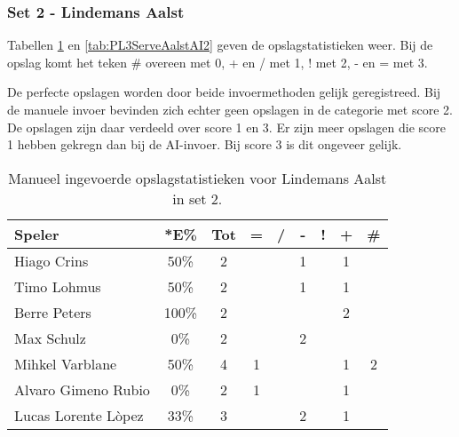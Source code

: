 \subsubsection{Set 2 - Lindemans Aalst}
\label{sec:PL3_Aalst2}

Tabellen  \ref{tab:PL3ServeAalstMan2} en \ref{tab:PL3ServeAalstAI2} geven de opslagstatistieken weer. Bij de opslag komt het teken \# overeen met 0, + en / met 1, ! met 2, - en = met 3.

De perfecte opslagen worden door beide invoermethoden gelijk geregistreed. Bij de manuele invoer bevinden zich echter geen opslagen in de categorie met score 2. De opslagen zijn daar verdeeld over score 1 en 3. Er zijn meer opslagen die score 1 hebben gekregn dan bij de AI-invoer. Bij score 3 is dit ongeveer gelijk.

\begin{table}[ht!]
    \centering
    \scriptsize
    \begin{tabular}{|l|c|c|c|c|c|c|c|c|}
        \hline
        \textbf{Speler} & *E\% & Tot & = & / & - & ! & + & \# \\ \hline
        Hiago Crins & 50\% & 2 &  &  & 1 &  & 1 &  \\
        Timo Lohmus & 50\% & 2 &  &  & 1 &  & 1 & \\ 
        Berre Peters & 100\% & 2 &  &  &  &  & 2 &\\ 
        Max Schulz & 0\% & 2 &  &  & 2 &  &  & \\ 
        Mihkel Varblane & 50\% & 4 & 1 &  &  & & 1 & 2 \\ 
        Alvaro Gimeno Rubio & 0\% & 2 & 1 &  &  &  & 1 &  \\ 
        Lucas Lorente Lòpez & 33\% & 3 &  &  & 2 &  & 1 & \\ \hline
    \end{tabular}
   \caption[Manueel ingevoerde opslagstatistieken voor Lindemans Aalst in set 2]{\label{tab:PL3ServeAalstMan2}Manueel ingevoerde opslagstatistieken voor Lindemans Aalst in set 2.}
\end{table}

